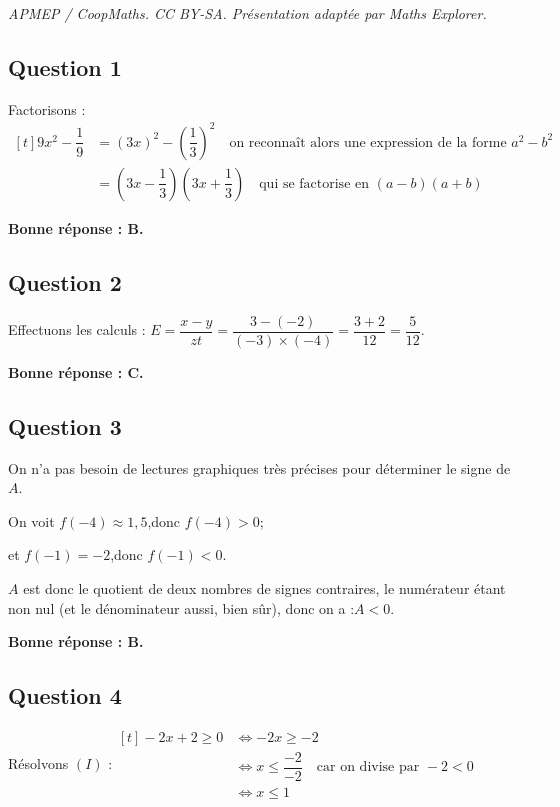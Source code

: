\documentclass[10pt]{article}
\begin{document}
\noindent\textit{APMEP / CoopMaths. CC BY-SA. Présentation adaptée par Maths Explorer.}\par\medskip
\subsection*{Question 1}
	Factorisons :\quad $\begin{aligned}[t]
		9x^2 - \dfrac{1}{9} &= (3x)^2 - \left(\dfrac{1}{3}\right)^2 \quad \text{on reconnaît alors une expression de la forme } a^2 - b^2\\
		&=\left(3x - \dfrac{1}{3}\right)\left(3x + \dfrac{1}{3}\right) \quad \text{qui se factorise en } (a - b)(a + b)
	\end{aligned}$

	\textbf{Bonne réponse : B.}

\subsection*{Question 2}
	Effectuons les calculs : \quad $E = \dfrac{x - y}{zt} = \dfrac{3 - (-2)}{(-3)\times(-4)} = \dfrac{3 + 2}{12} = \dfrac{5}{12}$.

	\textbf{Bonne réponse : C.}

\subsection*{Question 3}
On n'a pas besoin de lectures graphiques très précises pour déterminer le signe de $A$.

On voit \quad $f(-4) \approx 1,5$,\quad donc \quad $f(-4)>0$;

et \quad $f(-1) = -2$,\quad donc \quad $f(-1) < 0$.

$A$ est donc le quotient de deux nombres de signes contraires, le numérateur étant non nul (et le dénominateur aussi, bien sûr), donc on a :\quad $A < 0$.

\textbf{Bonne réponse : B.}

\subsection*{Question 4}
	Résolvons $(I)$ :\quad $\begin{aligned}[t] -2x + 2 \geqslant 0
		&\iff -2x \geqslant -2\\
		&\iff x \leqslant \dfrac{-2}{-2}\quad \text{car on divise par } -2 < 0\\
		&\iff x \leqslant 1
	\end{aligned}$
\end{document}

